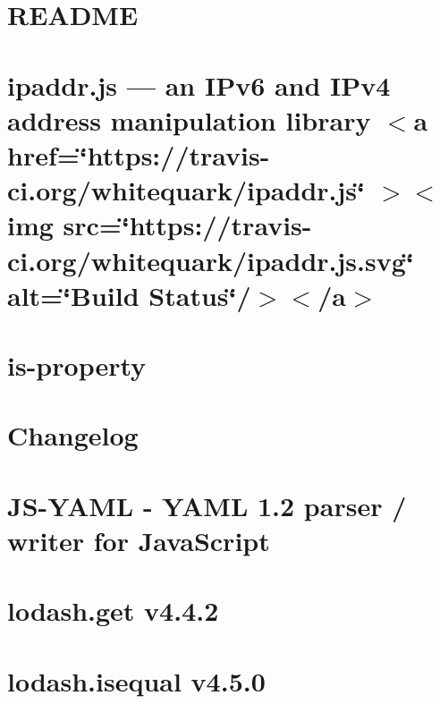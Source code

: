 \documentclass[twoside]{book}
\newcommand{\+}{\discretionary{\mbox{\scriptsize$\hookleftarrow$}}{}{}}
\begin{document}
\chapter{README}
\label{md_src_nodejs_node_modules_inherits_README}

\chapter{ipaddr.\+js — an IPv6 and IPv4 address manipulation library \texorpdfstring{$<$}{<}a href=\char`\"{}https\+://travis-\/ci.\+org/whitequark/ipaddr.\+js\char`\"{} \texorpdfstring{$>$}{>}\texorpdfstring{$<$}{<}img src=\char`\"{}https\+://travis-\/ci.\+org/whitequark/ipaddr.\+js.\+svg\char`\"{} alt=\char`\"{}\+Build Status\char`\"{}/\texorpdfstring{$>$}{>}\texorpdfstring{$<$}{<}/a\texorpdfstring{$>$}{>}}
\label{md_src_nodejs_node_modules_ipaddr_js_README}

\chapter{is-\/property}
\label{md_src_nodejs_node_modules_is_property_README}

\chapter{Changelog}
\label{md_src_nodejs_node_modules_js_yaml_CHANGELOG}

\chapter{JS-\/\+YAML -\/ YAML 1.2 parser / writer for Java\+Script}
\label{md_src_nodejs_node_modules_js_yaml_README}

\chapter{lodash.\+get v4.4.2}
\label{md_src_nodejs_node_modules_lodash_get_README}

\chapter{lodash.\+isequal v4.5.0}
\label{md_src_nodejs_node_modules_lodash_isequal_README}

\end{document}
